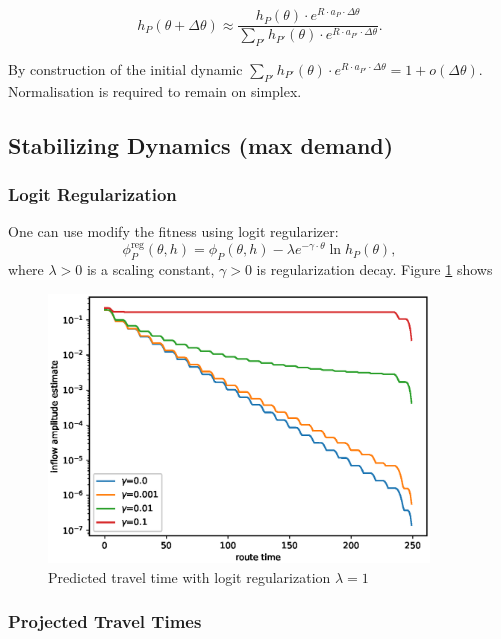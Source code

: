 \documentclass[12pt]{article}
\begin{document}
$$ h_P(\theta + \Delta\theta) \approx \frac{ h_P(\theta) \cdot e^{ R \cdot a_P \cdot \Delta \theta }} { \sum_{P'}  h_{P'}(\theta) \cdot e^{ R \cdot a_{P'} \cdot \Delta\theta } } .$$

By construction of the initial dynamic $\sum_{P'}  h_{P'}(\theta) \cdot e^{ R \cdot a_{P'} \cdot \Delta\theta } = 1 + o(\Delta \theta)$. Normalisation is required to remain on simplex.

\newpage

\subsection*{Stabilizing Dynamics (max demand)}

\subsubsection*{Logit Regularization}

One can use modify the fitness using logit regularizer:
$$ \phi^{\text{reg}}_P(\theta, h) = \phi_P(\theta, h) - \lambda e^{-\gamma \cdot \theta} \ln{ h_P(\theta) }, $$
where $\lambda > 0$ is a scaling constant, $\gamma > 0$ is regularization decay. Figure \ref{fig:reg_pred_tt} shows

\begin{figure}
	\includegraphics[width=0.9\textwidth]{img/reg_pred_tt.eps}
	\caption{Predicted travel time with logit regularization $\lambda=1$}
	\label{fig:reg_pred_tt}

\end{figure}

\subsubsection*{Projected Travel Times}
\end{document}
